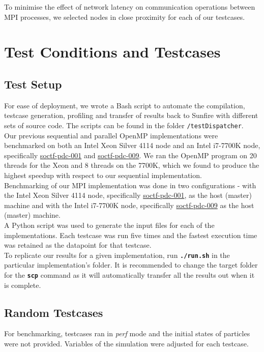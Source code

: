 \documentclass[12pt]{article}
\newcommand{\bt}[1]{\texttt{\textbf{#1}}}
\begin{document}
To minimise the effect of network latency on communication operations between MPI processes, we selected nodes in close proximity for each of our testcases.

\pagebreak

\section{Test Conditions and Testcases}

\subsection{Test Setup}

For ease of deployment, we wrote a Bash script to automate the compilation, testcase generation, profiling and transfer of results back to Sunfire with different sets of source code. The scripts can be found in the folder \texttt{/testDispatcher}.\\

Our previous sequential and parallel OpenMP implementations were benchmarked on both an Intel Xeon Silver 4114 node and an Intel i7-7700K node, specifically \ul{soctf-pdc-001} and \ul{soctf-pdc-009}. We ran the OpenMP program on 20 threads for the Xeon and 8 threads on the 7700K, which we found to produce the highest speedup with respect to our sequential implementation. \cite{assign1aref}\\

Benchmarking of our MPI implementation was done in two configurations - with the Intel Xeon Silver 4114 node, specifically \ul{soctf-pdc-001}, as the host (master) machine and with the Intel i7-7700K node, specifically \ul{soctf-pdc-009} as the host (master) machine.\\

A Python script was used to generate the input files for each of the implementations. Each testcase was run five times and the fastest execution time was retained as the datapoint for that testcase.\\

To replicate our results for a given implementation, run \bt{./run.sh} in the particular implementation's folder. It is recommended to change the target folder for the \bt{scp} command as it will automatically transfer all the results out when it is complete.

\subsection{Random Testcases}
For benchmarking, testcases ran in \textit{perf} mode and the initial states of particles were not provided. Variables of the simulation were adjusted for each testcase.\\
\end{document}
